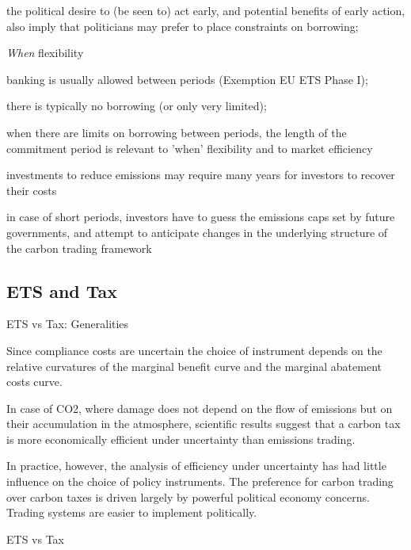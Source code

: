 	the political desire to (be seen to) act early, and potential benefits of early action,
also imply that politicians may prefer to place constraints on borrowing;


{{\it When} flexibility}


	banking is usually allowed between periods (Exemption EU ETS Phase I);

	there is typically no borrowing (or only very limited);

	when there are limits on borrowing between periods, the length of the commitment period is relevant to 'when' flexibility
and to market efficiency


	investments to reduce
emissions may require many years for investors to recover their costs

	in case of short periods, investors have to guess the emissions caps set by
future governments, and attempt to anticipate changes in the underlying structure of the
carbon trading framework



\subsection{ETS and Tax}

{ETS vs Tax: Generalities}


	Since compliance costs are uncertain the choice of instrument depends on the relative curvatures
of the marginal benefit curve and the marginal abatement costs curve.

	In case of CO2, where damage does not depend on the flow of emissions but on their accumulation in
the atmosphere, scientific results suggest that a carbon tax is more economically efficient under
uncertainty than emissions trading.

	In practice, however, the analysis of efficiency
under uncertainty has had little influence on the choice of policy instruments. The preference
for carbon trading over carbon taxes is driven largely by powerful political economy concerns.
Trading systems are easier to implement politically.

{ETS vs Tax}


